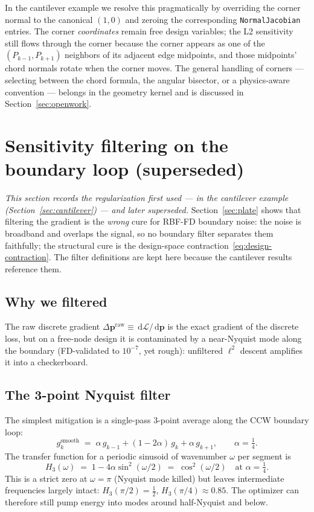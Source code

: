\documentclass[11pt,a4paper]{article}
\newcommand{\vect}[1]{\boldsymbol{#1}}
\newcommand{\pts}{\vect{p}}
\newcommand{\dd}{\,\mathrm{d}}
\newcommand{\Loss}{\mathcal{L}}
\begin{document}
In the cantilever example we resolve this pragmatically by
overriding the corner normal to the canonical $(1,0)$ and zeroing
the corresponding \texttt{NormalJacobian} entries. The corner
\emph{coordinates} remain free design variables; the L2
sensitivity still flows through the corner because the corner
appears as one of the $(P_{k-1}, P_{k+1})$ neighbors of its
adjacent edge midpoints, and those midpoints' chord normals rotate
when the corner moves. The general handling of corners ---
selecting between the chord formula, the angular bisector, or a
physics-aware convention --- belongs in the geometry kernel and is
discussed in Section~\ref{sec:openwork}.

\section{Sensitivity filtering on the boundary loop (superseded)}
\label{sec:filter}

\emph{This section records the regularization first used --- in the cantilever
example (Section~\ref{sec:cantilever}) --- and later superseded.}
Section~\ref{sec:plate} shows that filtering the gradient is the \emph{wrong} cure
for RBF-FD boundary noise: the noise is broadband and overlaps the signal, so no
boundary filter separates them faithfully; the structural cure is the design-space
contraction~\eqref{eq:design-contraction}. The filter definitions are kept here
because the cantilever results reference them.

\subsection{Why we filtered}

The raw discrete gradient $\Delta\pts^{\text{raw}} \equiv \dd\Loss/\dd\pts$ is the
exact gradient of the discrete loss, but on a free-node design it is contaminated by
a near-Nyquist mode along the boundary (FD-validated to $10^{-7}$, yet rough):
unfiltered $\ell^2$ descent amplifies it into a checkerboard.

\subsection{The 3-point Nyquist filter}

The simplest mitigation is a single-pass 3-point average along the
CCW boundary loop:
\begin{equation}
  g_k^{\text{smooth}}
  \;=\; \alpha\, g_{k-1} + (1 - 2\alpha)\, g_k + \alpha\, g_{k+1},
  \qquad \alpha = \tfrac{1}{4}.
\end{equation}
The transfer function for a periodic sinusoid of wavenumber
$\omega$ per segment is
\begin{equation}
  H_3(\omega) \;=\; 1 - 4\alpha\sin^2(\omega/2)
  \;=\; \cos^2(\omega/2)\quad\text{at }\alpha=\tfrac14.
\end{equation}
This is a strict zero at $\omega = \pi$ (Nyquist mode killed) but
leaves intermediate frequencies largely intact:
$H_3(\pi/2) = \tfrac12$, $H_3(\pi/4) \approx 0.85$. The optimizer
can therefore still pump energy into modes around half-Nyquist and
below.
\end{document}
